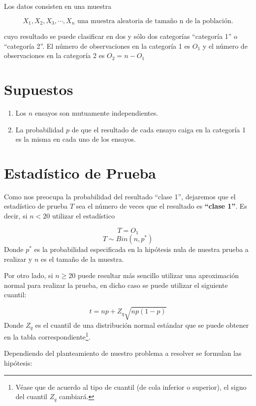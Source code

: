 \documentclass[
  a4paper,
  oneside,
  openany]{book}
\begin{document}
Los datos consisten en una muestra

\[X_{1},X_{2},X_{3},\cdots,X_{n}  \mbox{ una  muestra aleatoria  de  tamaño  n  de  la  población.}\]

cuyo resultado se puede clasificar en dos y sólo dos categorías ``categoría 1'' o ``categoría 2''. El número de observaciones en la categoría 1 es \(O_{1}\) y el número de observaciones en la categoría 2 es \(O_{2}=n-O_{1}\)

\hypertarget{supuestos}{%
\section{Supuestos}\label{supuestos}}

\begin{enumerate}
\def\labelenumi{\arabic{enumi})}
\item
  Los \(n\) ensayos son mutuamente independientes.
\item
  La probabilidad \(p\) de que el resultado de cada ensayo caiga en la categoría 1 es la misma en cada uno de los ensayos.
\end{enumerate}

\hypertarget{estaduxedstico-de-prueba}{%
\section{Estadístico de Prueba}\label{estaduxedstico-de-prueba}}

Como nos preocupa la probabilidad del resultado ``clase 1'', dejaremos que el estadístico de prueba \(T\) sea el número de veces que el resultado es \textbf{``clase 1''}.
Es decir, si \(n<20\) utilizar el estadístico

\[T=O_{1}\]
\[ T \sim Bin (n,p^*)\]
Donde \(p^*\) es la probabilidad especificada en la hipótesis nula de nuestra prueba a realizar y \(n\) es el tamaño de la muestra.

Por otro lado, si \(n\geq20\) puede resultar más sencillo utilizar una aproximación normal para realizar la prueba, en dicho caso se puede utilizar el siguiente cuantil:

\[t=np+Z_{q}\sqrt{np(1-p)}\]
Donde \(Z_{q}\) es el cuantil de una distribución normal estándar que se puede obtener en la tabla correspondiente\footnote{Véase que de acuerdo al tipo de cuantil (de cola inferior o superior), el signo del cuantil \(Z_q\) cambiará.}.

Dependiendo del planteamiento de nuestro problema a resolver se formulan las hipótesis:
\end{document}
